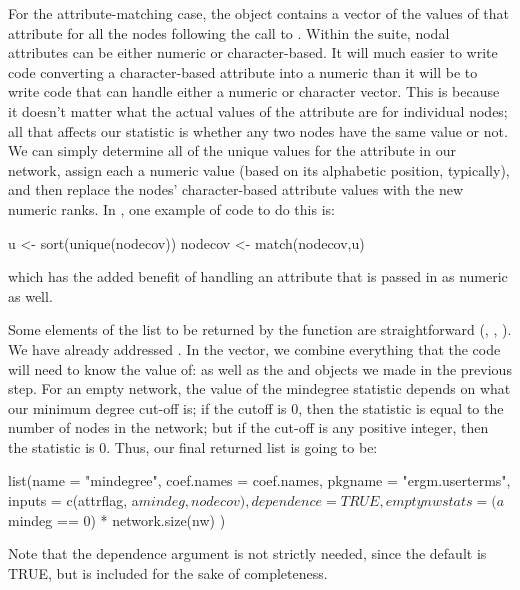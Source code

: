 \documentclass[nojss]{jss}
\begin{document}
For the attribute-matching case, the object  contains a vector of the
values of that attribute for all the nodes following the call to .
Within the  suite,
nodal attributes can be either numeric or character-based. It will much easier
to write  code converting a character-based attribute into a numeric
than it will be to write  code that can handle either a numeric or
character vector. This is because it doesn't matter what the actual values of
the attribute are for individual nodes; all that affects our statistic is
whether any two nodes have the same value or not. We can simply determine all of
the unique values for the attribute in our network, assign each a numeric value
(based on its alphabetic position, typically), and then replace the nodes'
character-based attribute values with the new numeric ranks. In ,
one example of code to do this is:
\begin{CodeChunk}
\begin{CodeInput}
    u <- sort(unique(nodecov))
    nodecov <- match(nodecov,u)
\end{CodeInput}
\end{CodeChunk}
which has the added benefit of handling an attribute that is passed in as
numeric as well.

Some elements of the list to be returned by the function are straightforward
(, , ). We have already addressed
. In the  vector, we combine everything that the
 code will need to know the value of:  as well as the
 and  objects we made in the previous step. For an
empty network, the value of the mindegree statistic depends on what our minimum
degree cut-off is; if the cutoff is 0, then the statistic is equal to the number
of nodes in the network; but if the cut-off is any positive integer, then the
statistic is 0. Thus, our final returned list is going to be:
\begin{CodeChunk}
\begin{CodeInput}
  list(name = "mindegree",
    coef.names = coef.names,
    pkgname = "ergm.userterms",
    inputs = c(attrflag, a$mindeg, nodecov),
    dependence = TRUE,
    emptynwstats = (a$mindeg == 0) * network.size(nw)
  )
\end{CodeInput}
\end{CodeChunk}

Note that the dependence argument is not strictly needed, since the default is
TRUE, but is included for the sake of completeness.
\end{document}
